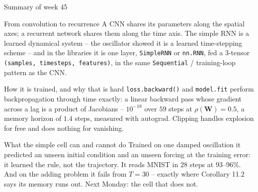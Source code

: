 \documentclass[10pt,aspectratio=169]{beamer}
\begin{document}
\begin{frame}{Summary of week 45}
\small
\begin{block}{From convolution to recurrence}
A CNN shares its parameters along the spatial axes; a recurrent network
shares them along the time axis.  The simple RNN is a learned dynamical
system -- the oscillator showed it is a learned time-stepping scheme -- and
in the libraries it is one layer, \texttt{SimpleRNN} or \texttt{nn.RNN},
fed a 3-tensor \texttt{(samples, timesteps, features)}, in the same
\texttt{Sequential} / training-loop pattern as the CNN.
\end{block}
\begin{block}{How it is trained, and why that is hard}
\texttt{loss.backward()} and \texttt{model.fit} perform backpropagation
through time exactly: a linear backward pass whose gradient across a lag is
a product of Jacobians -- $10^{-18}$ over $59$ steps at $\rho(\bm{W})=0.5$,
a memory horizon of $1.4$ steps, measured with autograd.  Clipping handles
explosion for free and does nothing for vanishing.
\end{block}
\begin{block}{What the simple cell can and cannot do}
Trained on one damped oscillation it predicted an unseen initial condition
and an unseen forcing at the training error: it learned the rule, not the
trajectory.  It reads MNIST in $28$ steps at $93$--$96\%$.  And on the
adding problem it fails from $T=30$ -- exactly where Corollary 11.2 says
its memory runs out.  Next Monday: the cell that does not.
\end{block}
\end{frame}
\end{document}
